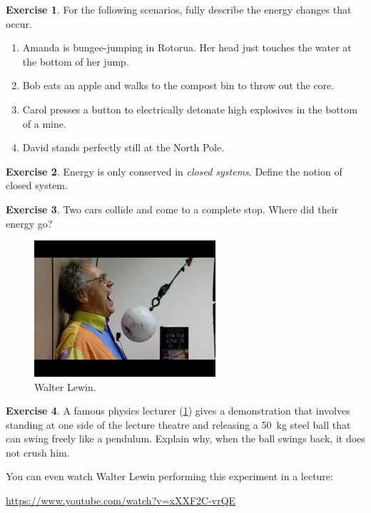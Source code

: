 \documentclass[a4paper]{amsbook}
\newcommand{\goandwatch}[1]{
\begin{center}
\begin{tcolorbox}[width=0.8\textwidth,colback={SkyBlue!20},title={\textbf{Go and watch...}},colbacktitle=MidnightBlue,coltitle=White]
  \textcolor{MidnightBlue}{\url{#1}}
\end{tcolorbox}
\end{center}}
\theoremstyle{definition}
\newtheorem{exercise}{Exercise}
\numberwithin{exercise}{chapter}
\numberwithin{exercise}{chapter}
\begin{document}
\begin{exercise}
  For the following scenarios, fully describe the energy changes that occur.
  \begin{enumerate}
    \item Amanda is bungee-jumping in Rotorua. Her head just touches the water at the bottom of her jump.
    \item Bob eats an apple and walks to the compost bin to throw out the core.
    \item Carol presses a button to electrically detonate high explosives in the bottom of a mine.
    \item David stands perfectly still at the North Pole.
  \end{enumerate}
\end{exercise}

\begin{exercise}
  Energy is only conserved in \textit{closed systems}. Define the notion of closed system.
\end{exercise}

\begin{exercise}
  Two cars collide and come to a complete stop. Where did their energy go?
\end{exercise}

\begin{figure}
  \centering
  \includegraphics[width=0.6\textwidth]{lewin}
  \caption{Walter Lewin.}\label{fig:lewin}
\end{figure}

\begin{exercise}
  A famous physics lecturer (\cref{fig:lewin}) gives a demonstration that involves standing at one side of the lecture theatre
  and releasing a \SI{50}{\kilo\gram} steel ball that can swing freely like a pendulum. Explain why, when the
  ball swings back, it does not crush him.
\end{exercise}

You can even watch Walter Lewin performing this experiment in a lecture:
\goandwatch{https://www.youtube.com/watch?v=xXXF2C-vrQE}
\end{document}
